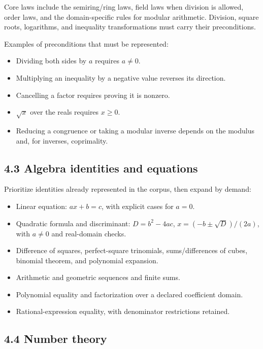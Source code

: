 \documentclass[
  10pt,
]{article}
\providecommand{\tightlist}{%
  \setlength{\itemsep}{0pt}\setlength{\parskip}{0pt}}
\begin{document}
Core laws include the semiring/ring laws, field laws when division is
allowed, order laws, and the domain-specific rules for modular
arithmetic. Division, square roots, logarithms, and inequality
transformations must carry their preconditions.

Examples of preconditions that must be represented:

\begin{itemize}
\tightlist
\item
  Dividing both sides by \(a\) requires \(a\ne0\).
\item
  Multiplying an inequality by a negative value reverses its direction.
\item
  Cancelling a factor requires proving it is nonzero.
\item
  \(\sqrt{x}\) over the reals requires \(x\ge0\).
\item
  Reducing a congruence or taking a modular inverse depends on the
  modulus and, for inverses, coprimality.
\end{itemize}

\subsection{4.3 Algebra identities and
equations}\label{algebra-identities-and-equations}

Prioritize identities already represented in the corpus, then expand by
demand:

\begin{itemize}
\tightlist
\item
  Linear equation: \(ax+b=c\), with explicit cases for \(a=0\).
\item
  Quadratic formula and discriminant: \(D=b^2-4ac\),
  \(x=(-b\pm\sqrt D)/(2a)\), with \(a\ne0\) and real-domain checks.
\item
  Difference of squares, perfect-square trinomials, sums/differences of
  cubes, binomial theorem, and polynomial expansion.
\item
  Arithmetic and geometric sequences and finite sums.
\item
  Polynomial equality and factorization over a declared coefficient
  domain.
\item
  Rational-expression equality, with denominator restrictions retained.
\end{itemize}

\subsection{4.4 Number theory}\label{number-theory}
\end{document}
